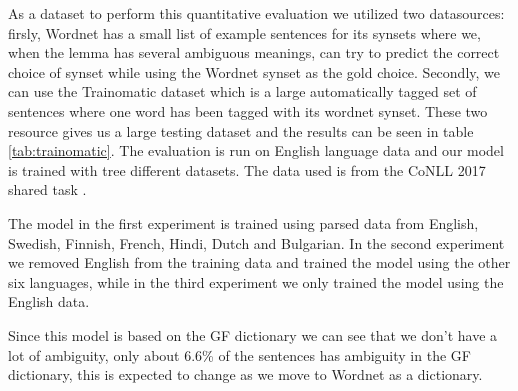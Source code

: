 As a dataset to perform this quantitative evaluation we utilized two datasources: firsly, Wordnet \citep{miller1995wordnet} has a small list of example sentences for its synsets where we, when the lemma has several ambiguous meanings, can try to predict the correct choice of synset while using the Wordnet synset as the gold choice. Secondly, we can use the Trainomatic dataset \citep{pasini2017trainomatic} which is a large automatically tagged set of sentences where one word has been tagged with its wordnet synset. These two resource gives us a large testing dataset and the results can be seen in table \ref{tab:trainomatic}. The evaluation is run on English language data and our model is trained with tree different datasets. The data used is from the CoNLL 2017 shared task \citep{ginter2017conll}. 

The model in the first experiment is trained using parsed data from English, Swedish, Finnish, French, Hindi, Dutch and Bulgarian. In the second experiment we removed English from the training data and trained the model using the other six languages, while in the third experiment we only trained the model using the English data.

Since this model is based on the GF dictionary we can see that we don't have a lot of ambiguity, only about 6.6\% of the sentences has ambiguity in the GF dictionary, this is expected to change as we move to Wordnet as a dictionary.  



